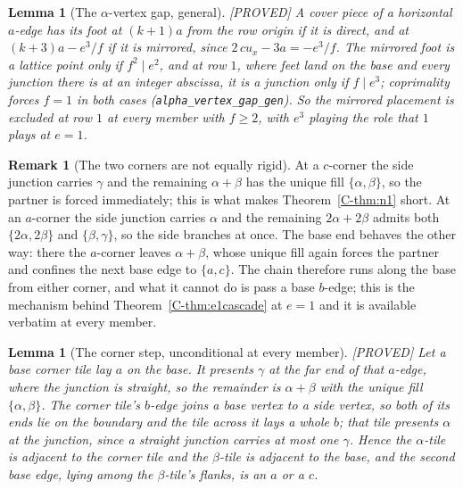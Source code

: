 \documentclass[11pt,reqno]{amsart}
\theoremstyle{plain}
\newtheorem{lemma}[theorem]{Lemma}
\theoremstyle{definition}
\newtheorem{remark}[theorem]{Remark}
\newcommand{\lab}[1]{\hfill\textnormal{\footnotesize\textsc{[#1]}}}
\begin{document}
\begin{lemma}[The $\alpha$-vertex gap, general]\label{lem:avgen}\lab{PROVED}
A cover piece of a horizontal $a$-edge has its foot at $(k+1)a$ from the row origin if it is
direct, and at $(k+3)a-e^3/f$ if it is mirrored, since $2\,cu_x-3a=-e^3/f$. The mirrored foot is a
lattice point only if $f^2\mid e^2$, and at row $1$, where feet land on the base and every
junction there is at an integer abscissa, it is a junction only if $f\mid e^3$; coprimality forces
$f=1$ in both cases (\texttt{alpha\_vertex\_gap\_gen}). So the mirrored placement is excluded at
row $1$ at every member with $f\ge2$, with $e^3$ playing the role that $1$ plays at $e=1$.
\end{lemma}

\begin{remark}[The two corners are not equally rigid]\label{rem:cornerasym}
At a $c$-corner the side junction carries $\gamma$ and the remaining $\alpha+\beta$ has the unique
fill $\{\alpha,\beta\}$, so the partner is forced immediately; this is what makes
Theorem~\ref{C-thm:n1} short. At an $a$-corner the side junction carries $\alpha$ and the remaining
$2\alpha+2\beta$ admits both $\{2\alpha,2\beta\}$ and $\{\beta,\gamma\}$, so the side branches at
once. The base end behaves the other way: there the $a$-corner leaves $\alpha+\beta$, whose unique
fill again forces the partner and confines the next base edge to $\{a,c\}$. The chain therefore
runs along the base from either corner, and what it cannot do is pass a base $b$-edge; this is the
mechanism behind Theorem~\ref{C-thm:e1cascade} at $e=1$ and it is available verbatim at every member.
\end{remark}

\begin{lemma}[The corner step, unconditional at every member]\label{lem:cornerstep}\lab{PROVED}
Let a base corner tile lay $a$ on the base. It presents $\gamma$ at the far end of that $a$-edge,
where the junction is straight, so the remainder is $\alpha+\beta$ with the unique fill
$\{\alpha,\beta\}$. The corner tile's $b$-edge joins a base vertex to a side vertex, so both of
its ends lie on the boundary and the tile across it lays a whole $b$; that tile presents $\alpha$
at the junction, since a straight junction carries at most one $\gamma$. Hence the $\alpha$-tile
is adjacent to the corner tile and the $\beta$-tile is adjacent to the base, and the second base
edge, lying among the $\beta$-tile's flanks, is an $a$ or a $c$.
\end{lemma}
\end{document}
